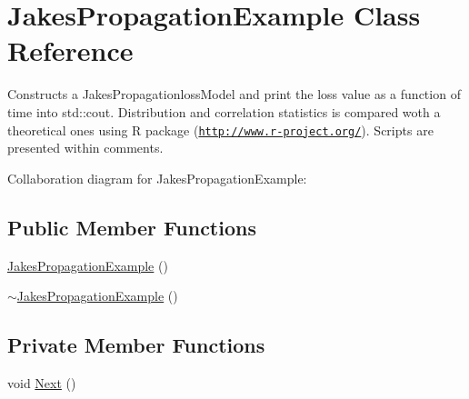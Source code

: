 \hypertarget{classJakesPropagationExample}{}\section{Jakes\+Propagation\+Example Class Reference}
\label{classJakesPropagationExample}


Constructs a Jakes\+Propagationloss\+Model and print the loss value as a function of time into std\+::cout. Distribution and correlation statistics is compared woth a theoretical ones using R package (\href{http://www.r-project.org/}{\tt http\+://www.\+r-\/project.\+org/}). Scripts are presented within comments.  




Collaboration diagram for Jakes\+Propagation\+Example\+:
\subsection*{Public Member Functions}
\begin{DoxyCompactItemize}
\item 
\hyperlink{classJakesPropagationExample_aecb2c5ae4d1b8545fdf9d4cf92365a0e}{Jakes\+Propagation\+Example} ()
\item 
\hyperlink{classJakesPropagationExample_a24c1667d0298dfa1479c0083a99a3ca1}{$\sim$\+Jakes\+Propagation\+Example} ()
\end{DoxyCompactItemize}
\subsection*{Private Member Functions}
\begin{DoxyCompactItemize}
\item 
void \hyperlink{classJakesPropagationExample_a36fd2bb995aace95f298c53ca25a7c32}{Next} ()
\end{DoxyCompactItemize}
